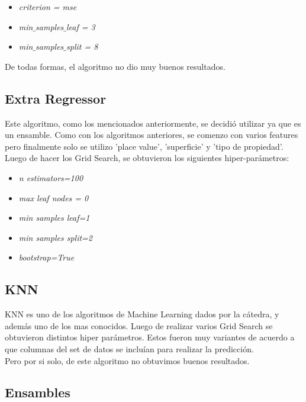 \documentclass[a4paper, 10pt]{article}
\newcommand\tab[1][0.5cm]{\hspace*{#1}}
\begin{document}
			\begin{itemize}
				\item \emph{criterion = mse}
				\item \emph{min$\_$samples$\_$leaf = 3}
				\item \emph{min$\_$samples$\_$split = 8} 
			\end{itemize}
		\tab De todas formas, el algoritmo no dio muy buenos resultados.
		
		\subsection{Extra Regressor}
		Este algoritmo, como los mencionados anteriormente, se decidió utilizar ya que es un ensamble. Como con los algoritmos anteriores, se comenzo con varios features pero finalmente solo se utilizo 'place value', 'superficie' y 'tipo de propiedad'.
		Luego de hacer los Grid Search, se obtuvieron los siguientes hiper-parámetros:
		\begin{itemize}
		
		\item \emph{n estimators=100}
			
		\item \emph{max leaf nodes = 0}

		\item \emph{min samples leaf=1}
		
		\item \emph{min samples split=2}
		
		\item \emph{bootstrap=True}
	
		\end{itemize}				

		\subsection{KNN}
		
		KNN es uno de los algoritmos de Machine Learning dados por la cátedra, y además uno de los mas conocidos.
		Luego de realizar varios Grid Search se obtuvieron distintos hiper parámetros. Estos fueron muy variantes de acuerdo a que columnas del set de datos se incluían para realizar la predicción. \\

		\tab Pero por si solo, de este algoritmo no obtuvimos buenos resultados.

		\subsection{Ensambles}		
		
\end{document}
